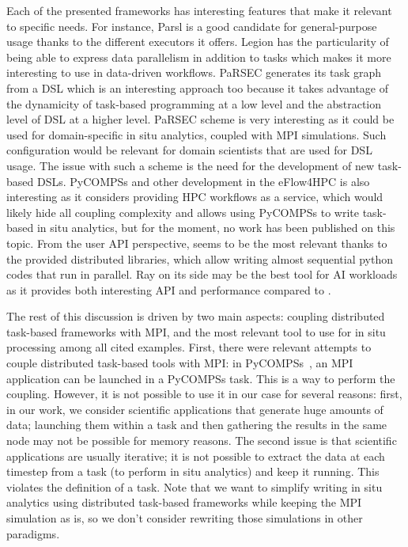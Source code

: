 Each of the presented frameworks has interesting features that make it relevant to specific needs. For instance, 
Parsl is a good candidate for general-purpose usage thanks to the different executors it offers. 
Legion has the particularity of being able to express data parallelism in addition to tasks which makes it more interesting to use in data-driven workflows. 
PaRSEC generates its task graph from a DSL which is an interesting approach too because it takes advantage of the dynamicity of task-based programming at a low level and the abstraction level of DSL at a higher level. 
PaRSEC scheme is very interesting as it could be used for domain-specific in situ analytics, coupled with MPI simulations. Such configuration would be relevant for domain scientists that are used for DSL usage. The issue with such a scheme is the need for the development of new task-based DSLs.
PyCOMPSs and other development in the eFlow4HPC is also interesting as it considers providing HPC workflows as a service, which would likely hide all coupling complexity and allows using PyCOMPSs to write task-based in situ analytics, but for the moment, no work has been published on this topic. 
From the user API perspective, \dask seems to be the most relevant thanks to the provided distributed libraries, which allow writing  almost sequential python codes that run in parallel.  Ray on its side may be the best tool for AI workloads as it provides both interesting API and performance compared to \dask.

The rest of this discussion is driven by two main aspects: coupling distributed task-based frameworks with MPI, and the most relevant tool to use for in situ processing among all cited examples.
First, there were relevant attempts to couple distributed task-based tools with MPI: 
in PyCOMPSs~\cite{elshazly_performance_2020_pycompss}, an MPI application can be launched in a PyCOMPSs task. This is a way to perform the coupling. However, it is not possible to use it in our case for several reasons: 
first, in our work, we consider scientific applications that generate huge amounts of data; launching them within a task and then gathering the results in the same node may not be possible for memory reasons. The second issue is that scientific applications are usually iterative; it is not possible to extract the data at each timestep from a task (to perform in situ analytics) and keep it running. This violates the definition of a task. Note that we want to simplify writing in situ analytics using distributed task-based frameworks while keeping the MPI simulation as is, so we don't consider rewriting those simulations in other paradigms.  

